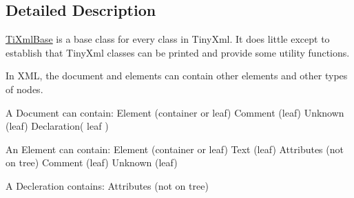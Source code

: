 \subsection{Detailed Description}
\hyperlink{class_ti_xml_base}{Ti\+Xml\+Base} is a base class for every class in Tiny\+Xml. It does little except to establish that Tiny\+Xml classes can be printed and provide some utility functions.

In X\+M\+L, the document and elements can contain other elements and other types of nodes.

\begin{DoxyVerb}A Document can contain:    Element    (container or leaf)
                        Comment (leaf)
                        Unknown (leaf)
                        Declaration( leaf )

An Element can contain:    Element (container or leaf)
                        Text    (leaf)
                        Attributes (not on tree)
                        Comment (leaf)
                        Unknown (leaf)

A Decleration contains: Attributes (not on tree)
\end{DoxyVerb}
 

